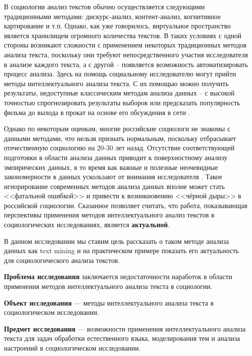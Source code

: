 В социологии анализ текстов обычно осуществляется следующими традиционными методами: дискурс-анализ, контент-анализ, когнитивное картирование и т.п. Однако, как уже говорилось, виртуальное пространство является хранилищем огромного количества текстов. В таких условиях с одной стороны возникают сложности с применением некоторых традиционных методов анализа текста, поскольку они требуют непосредственного участия исследователя в анализе каждого текста, а с другой -- появляется возможность автоматизировать процесс анализа. Здесь на помощь социальному исследователю могут прийти методы интеллектуального анализа текста. С их помощью можно получить результаты, недоступные классическим методам анализа данных -- с высокой точностью спрогнозировать результаты выборов \cite{venezuala} или предсказать популярность фильма до выхода в прокат на основе его обсуждения в сети \cite{hp_predicting}.

Однако по некоторым оценкам, многие российские социологи не знакомы с данными методами, что нельзя признать нормальным, поскольку отбрасывает отечественную социологию на 20-30 лет назад. Отсутствие соответствующей подготовки в области анализа данных приводит к поверхностному анализу эмпирических данных, в то время как важные и полезные неочевидные закономерности в данных ускользают от внимания исследователя \cite{Davydov_Knowledge}. Такое игнорирование современных методов анализа данных вполне может стать <<фатальной ошибкой>> \cite{Davidov_fatal} и привести к возникновению <<чёрной дыры>> \cite{black_hole} в российской социологии. Сказанное позволяет считать, что работа, показывающая перспективы применения методов интеллектуального анализ текстов в социологических исследованиях, является \textbf{актуальной}.

В данном исследовании мы ставим цель рассказать о таком методе анализа данных как text mining и на практическом примере показать его актуальность для социологического анализа текстов.

\textbf{Проблема исследования} заключается недостаточности наработок в области применения методов интеллектуального анализа текста в социологии.

\textbf{Объект исследования} --- методы интеллектуального анализа текста в социологическом исследовании.

\textbf{Предмет исследования} --- возможности применения интеллектуального анализа текста для задач обработки естественного языка, моделирования тем и анализа настроений в социологическом исследовании.

\clearpage
